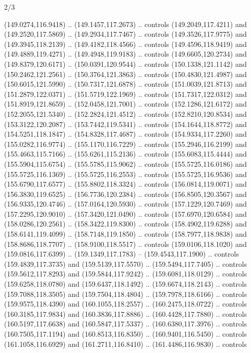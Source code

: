 \begin{flagdescription}{2/3}
\begin{scope}[shift={(0.5\flaglength,0.5)},scale=\flagwidth/320]
\begin{scope}[y=0.8pt, x=0.8pt, yscale=-1,shift={(-118.3,-146)}]
  (149.0274,116.9418) .. (149.1457,117.2673) .. controls (149.2049,117.4211) and
  (149.2520,117.5869) .. (149.2934,117.7467) .. controls (149.3526,117.9775) and
  (149.3945,118.2139) .. (149.4182,118.4566) .. controls (149.4596,118.9419) and
  (149.4889,119.4271) .. (149.4948,119.9183) .. controls (149.6605,120.2734) and
  (149.8379,120.6171) .. (150.0391,120.9544) .. controls (150.1338,121.1142) and
  (150.2462,121.2561) .. (150.3764,121.3863) .. controls (150.4830,121.4987) and
  (150.6015,121.5990) .. (150.7317,121.6878) .. controls (151.0039,121.8713) and
  (151.2879,122.0371) .. (151.5719,122.1969) .. controls (151.7317,122.0312) and
  (151.8919,121.8659) .. (152.0458,121.7001) .. controls (152.1286,121.6172) and
  (152.2055,121.5340) .. (152.2824,121.4512) .. controls (152.8210,120.8534) and
  (153.3122,120.2087) .. (153.7442,119.5341) .. controls (154.1644,118.8772) and
  (154.5251,118.1847) .. (154.8328,117.4687) .. controls (154.9334,117.2260) and
  (155.0282,116.9774) .. (155.1170,116.7229) .. controls (155.2946,116.2199) and
  (155.4663,115.7166) .. (155.6261,115.2136) .. controls (155.6083,115.4444) and
  (155.5904,115.6754) .. (155.5785,115.9062) .. controls (155.5725,116.0186) and
  (155.5725,116.1369) .. (155.5725,116.2553) .. controls (155.5725,116.9536) and
  (155.6790,117.6577) .. (155.8802,118.3324) .. controls (156.0814,119.0071) and
  (156.3830,119.6525) .. (156.7736,120.2384) .. controls (156.8505,120.3567) and
  (156.9335,120.4746) .. (157.0164,120.5930) .. controls (157.1229,120.7469) and
  (157.2295,120.9010) .. (157.3420,121.0490) .. controls (157.6970,120.6584) and
  (158.0286,120.2561) .. (158.3422,119.8300) .. controls (158.4902,119.6288) and
  (158.6141,119.4099) .. (158.7148,119.1850) .. controls (158.7977,118.9838) and
  (158.8686,118.7707) .. (158.9100,118.5517) .. controls (159.0106,118.1020) and
  (159.0816,117.6399) .. (159.1349,117.1783) -- (159.4543,117.1900) .. controls
  (159.4839,117.3735) and (159.5139,117.5570) .. (159.5494,117.7405) .. controls
  (159.5612,117.8293) and (159.5844,117.9242) .. (159.6081,118.0129) .. controls
  (159.6258,118.0780) and (159.6437,118.1492) .. (159.6674,118.2143) .. controls
  (159.7088,118.3505) and (159.7504,118.4804) .. (159.7978,118.6166) .. controls
  (159.9575,118.4390) and (160.1055,118.2557) .. (160.2475,118.0722) .. controls
  (160.3185,117.9834) and (160.3836,117.8886) .. (160.4428,117.7880) .. controls
  (160.5197,117.6638) and (160.5847,117.5337) .. (160.6380,117.3976) .. controls
  (160.7505,117.1194) and (160.8513,116.8350) .. (160.9401,116.5450) .. controls
  (161.1058,116.6929) and (161.2711,116.8410) .. (161.4486,116.9830) .. controls

\end{scope}
\end{scope}
\end{flagdescription}
